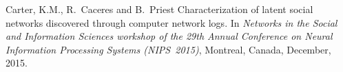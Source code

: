 \documentclass[10pt]{article}
\begin{document}
\begin{bibenum}

\item {}

\item {}

\item Carter, K.M., R.~Caceres and B.~Priest
Characterization of latent social networks discovered through computer network logs.
In \emph{Networks in the Social and Information Sciences workshop of the 29th Annual Conference on Neural Information Processing Systems (NIPS~2015)},
Montreal, Canada,
December, 2015.

\item {}

\end{bibenum}
\end{document}
